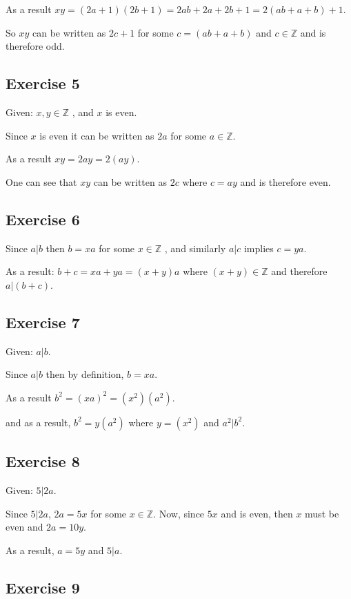 \documentclass[a4paper]{article}
\begin{document}
As a result $xy = (2a+1)(2b+1) = 2ab + 2a + 2b + 1 = 2(ab+a+b)+1$.

So $xy$ can be written as $2c+1$ for some $c=(ab+a+b)$ and $c \in \mathbb{Z}$
and is therefore odd.

\subsection{Exercise 5}

Given: $ x, y \in \mathbb{Z} $ , and $x$ is even.

Since $x$ is even it can be written as $2a$ for some $a \in \mathbb{Z}$.

As a result $xy = 2ay = 2(ay)$.

One can see that $xy$ can be written as $2c$ where $c = ay$ and is therefore
even.

\subsection{Exercise 6}

Since $a | b$ then $b = xa$ for some $x \in \mathbb{Z}$ , and similarly $a | c$
implies $c = ya$.

As a result: $b+c = xa + ya = (x+y)a$ where $ (x+y) \in \mathbb{Z}$ and
therefore $a|(b+c)$.

\subsection{Exercise 7}

Given: $a | b$.

Since $a | b$ then by definition, $b = xa$.

As a result $b^2 = (xa)^2 = (x^2)(a^2)$.

and as a result, $b^2 = y(a^2)$ where $y=(x^2)$ and $a^2|b^2$.

\subsection{Exercise 8}

Given: $5 | 2a$.

Since $5 | 2a$, $2a = 5x$ for some $x \in \mathbb{Z} $. Now, since $5x$
and is even, then $x$ must be even and $2a = 10y$.

As a result, $a = 5y$ and $5 | a$.

\subsection{Exercise 9}
\end{document}
